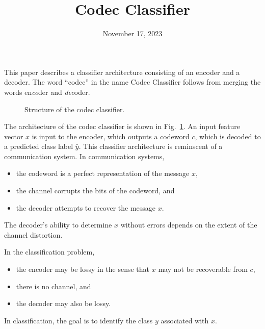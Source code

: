 \documentclass{article}
\title{Codec Classifier}
\date{November 17, 2023}
\begin{document}
\maketitle

This paper describes a classifier architecture consisting of an encoder and a decoder.  The word ``codec'' in the name Codec Classifier follows from merging the words en{\it co}der and {\it dec}oder.

\begin{figure}
  \begin{center}
\end{center}
\label{fig:arch}
\caption{Structure of the codec classifier.}
\end{figure}

The architecture of the codec classifier is shown in Fig.~\ref{fig:arch}.  An input feature vector $x$ is input to the encoder, which outputs a codeword $c$, which is decoded to a predicted class label $\hat{y}$.  This classifier architecture is reminscent of a communication system.  In communication systems,
\begin{itemize}
  \item the codeword is a perfect representation of the message $x$,
  \item the channel corrupts the bits of the codeword, and
  \item the decoder attempts to recover the message $x$.
\end{itemize}
The decoder's ability to determine $x$ without errors depends on the extent of the channel distortion.

In the classification problem,
\begin{itemize}
\item the encoder may be lossy in the sense that $x$ may not be recoverable from $c$,
\item there is no channel, and
\item the decoder may also be lossy.
\end{itemize}
In classification, the goal is to identify the class $y$ associated with $x$.
\end{document}
